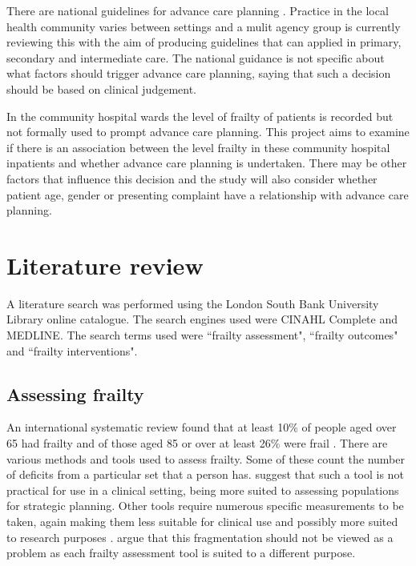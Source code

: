 \documentclass
[
	12pt,
	a4paper,
	oneside,
]{article}
\begin{document}
There are national guidelines for advance care planning \parencite{rcp:09}. 
Practice in the local health community varies between settings and a mulit agency 
group is currently reviewing this with the aim of producing guidelines that can 
applied in primary, secondary and intermediate care. The national guidance is not specific
about what factors should trigger advance care planning, saying that such a decision
should be based on clinical judgement.

In the community hospital wards the level of frailty of patients is recorded but 
not formally used to prompt advance
care planning. This project aims to examine if there is an association between the 
level frailty in these community hospital inpatients and whether advance care planning
is undertaken. There may be other factors that influence this decision and the
study will also consider whether patient age, gender or presenting complaint have 
a relationship with advance care planning.

\section{Literature review}

A literature search was performed using the London South Bank University Library 
online catalogue. The search engines used were CINAHL Complete and MEDLINE. The
search terms used were ``frailty assessment", ``frailty outcomes" and ``frailty 
interventions".

\subsection{Assessing frailty}
An international systematic review found 
that at least 10\% of people aged over 65 had frailty and of those aged 85 or over
at least 26\% were frail \parencite{collard:12}. There are various methods and tools used to assess frailty.
Some of these count the number of deficits from a particular set that a person has. 
\textcite{sternberg:08} suggest that such a tool is not practical for use in a clinical
setting, being more suited to assessing populations for strategic planning. 
Other tools require numerous specific measurements to be taken, again making them
less suitable for clinical use \parencite{martin:08} and possibly more suited to research purposes
\parencite{ensrud:08}. \textcite{romero-ortuno:16} argue that this fragmentation should not
be viewed as a problem as each frailty assessment tool is suited to a different 
purpose. 
\end{document}
